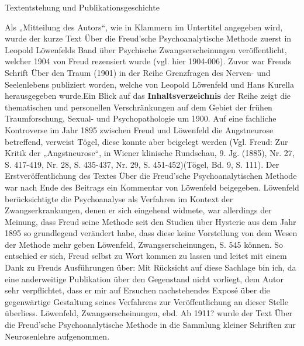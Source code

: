 \documentclass[twoside=true,titlepage=false,open=any, parskip=never, fontsize=10pt, headings=small, chapterprefix=false, appendixprefix=false]{scrbook}
\begin{document}
        \beginnumbering
        
            Textentstehung und Publikationsgeschichte
            \pend
            \pstart
            
                  Als „Mitteilung des Autors“, wie in Klammern im
                  Untertitel angegeben wird, wurde der kurze Text Über die Freud’sche
                     Psychoanalytische Methode zuerst in  Leopold Löwenfelds Band über Psychische Zwangserscheinungen veröffentlicht,
                  welcher 1904 von Freud rezensiert wurde (vgl. hier 1904-006).
                  Zuvor war Freuds Schrift Über den Traum (1901) 
                  in der Reihe Grenzfragen des
                  Nerven- und Seelenlebens publiziert worden, welche von Leopold
                  Löwenfeld und Hans Kurella
                  herausgegeben wurde.Ein Blick auf das \textbf{Inhaltsverzeichnis} der Reihe zeigt die thematischen und
                  personellen Verschränkungen auf dem Gebiet der frühen Traumforschung, Sexual- und
                  Psychopathologie um 1900.
                  Auf eine fachliche Kontroverse im Jahr 1895 zwischen
                  Freud und Löwenfeld die Angstneurose betreffend, verweist Tögel, diese konnte aber
                  beigelegt werden (Vgl. Freud: Zur Kritik der
                  „Angstneurose“, in Wiener klinische Rundschau, 9. Jg. (1885), Nr.
                  27, S. 417-419, Nr. 28, S. 435-437, Nr. 29, S. 451-452)(Tögel, Bd. 9, S. 111). 
                  Der Erstveröffentlichung des Textes Über die Freud’sche Psychoanalytischen
                  Methode war nach Ende des Beitrags ein Kommentar von Löwenfeld
                  beigegeben.              
                  Löwenfeld berücksichtigte die Psychoanalyse als Verfahren im Kontext der
                  Zwangserkrankungen, denen er sich eingehend widmete, war allerdings der Meinung,
                  dass Freud seine Methode seit den Studien über Hysterie aus dem Jahr 1895 so
                  grundlegend verändert habe, dass diese keine
                  Vorstellung von dem Wesen der Methode mehr geben
                  Löwenfeld, Zwangserscheinungen, S. 545 können. So
                  entschied er sich, Freud selbst zu Wort kommen zu lassen und leitet mit einem Dank
                  zu Freuds Ausführungen über: Mit Rücksicht auf
                  diese Sachlage bin ich, da eine anderweitige Publikation über den Gegenstand
                  nicht vorliegt, dem Autor sehr verpflichtet, dass er mir auf Ersuchen
                  nachstehendes Exposé über die gegenwärtige Gestaltung seines Verfahrens zur
                  Veröffentlichung an dieser Stelle überliess.
                  Löwenfeld, Zwangserscheinungen, ebd.
                  Ab 1911? wurde der Text Über die Freud’sche Psychoanalytische Methode in die
                     Sammlung kleiner Schriften zur Neurosenlehre aufgenommen.
               
\end{document}
